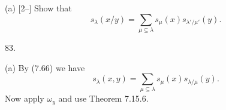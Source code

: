 (a) [2--] Show that
\[
s_\lambda(x/y)=\sum_{\mu\subseteq\lambda} s_\mu(x)s_{\lambda'/\mu'}(y). \tag{5}
\]

83.

(a) By (7.66) we have
\[
s_\lambda(x,y)=\sum_{\mu\subseteq\lambda} s_\mu(x)s_{\lambda/\mu}(y).
\]
Now apply $\omega_y$ and use Theorem 7.15.6.
